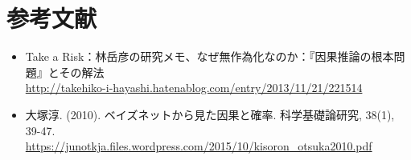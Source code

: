 \documentclass{jsarticle}
\begin{document}
\section{参考文献}
\begin{itemize}
 \item Take a Risk：林岳彦の研究メモ、なぜ無作為化なのか：『因果推論の根本問題』とその解法\\
       \url{http://takehiko-i-hayashi.hatenablog.com/entry/2013/11/21/221514}
 \item 大塚淳. (2010). ベイズネットから見た因果と確率. 科学基礎論研究, 38(1), 39-47.\\
       \url{https://junotkja.files.wordpress.com/2015/10/kisoron_otsuka2010.pdf}
\end{itemize}
\end{document}
